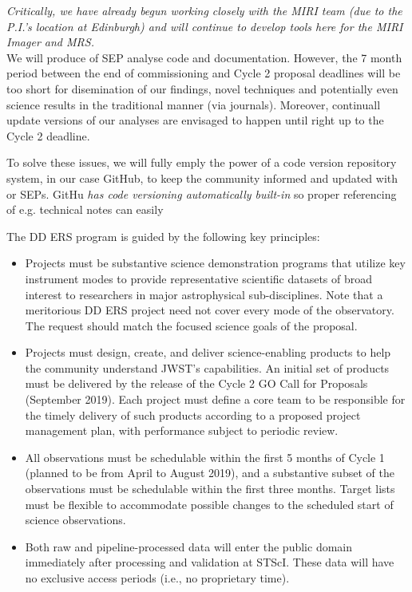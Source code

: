 \noindent
{\it Critically, we have already begun working closely with the MIRI team (due to the P.I.'s location at Edinburgh) and will continue to develop tools here for the MIRI Imager and MRS.}\\

\noindent
We will produce of SEP analyse code and documentation.  However, the 7
month period between the end of commissioning and Cycle 2 proposal
deadlines will be too short for disemination of our findings, novel
techniques and potentially even science results in the traditional
manner (via journals). Moreover,  continuall update versions 
of our analyses are envisaged to happen until right up to the Cycle 2 deadline. 

To solve these issues, we will fully emply the power of a code version
repository system, in our case GitHub, to keep the community informed
and updated with or SEPs. GitHu {\it has code versioning automatically
built-in} so proper referencing of e.g. technical notes can easily


\noindent
The DD ERS program is guided by the following key principles:
\begin{itemize}
\item Projects must be substantive science demonstration programs that utilize key instrument modes to provide representative scientific datasets of broad interest to researchers in major astrophysical sub-disciplines. Note that a meritorious DD ERS project need not cover every mode of the observatory. The request should match the focused science goals of the proposal.

\item Projects must design, create, and deliver science-enabling products to help the community understand JWST's capabilities.  An initial set of products must be delivered by the release of the Cycle 2 GO Call for Proposals (September 2019).  Each project must define a core team to be responsible for the timely delivery of such products according to a proposed project management plan, with performance subject to periodic review.

\item All observations must be schedulable within the first 5 months of Cycle 1 (planned to be from April to August 2019), and a substantive subset of the observations must be schedulable within the first three months.   Target lists must be flexible to accommodate possible changes to the scheduled start of science observations.

\item Both raw and pipeline-processed data will enter the public domain immediately after processing and validation at STScI. These data will have no exclusive access periods (i.e., no proprietary time).
\end{itemize}




